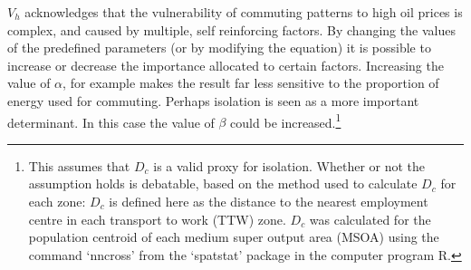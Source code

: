 $V_h$ acknowledges that the vulnerability of commuting patterns to high oil
prices is complex, and caused by multiple, self reinforcing factors. By
changing the values of the predefined parameters (or by modifying the equation)
it is possible to increase or decrease the importance allocated to certain
factors. Increasing the value of $\alpha$, for example makes the result far less
sensitive to the proportion of energy used for commuting. Perhaps isolation is
seen as a more important determinant. In this case the value of $\beta$ could
be increased.\footnote{This
assumes that $D_{c}$ is a valid proxy for isolation.
Whether or not the assumption holds is debatable, based on the method used to
calculate $D_{c}$ for each zone: $D_{c}$ is defined here as the
distance to the nearest employment centre in each
transport to work (TTW) zone.  $D_{c}$ was  calculated for the
population centroid of each medium super output area (MSOA) using
the command `nncross' from the `spatstat' package in the computer program R.
}


% 
% 

